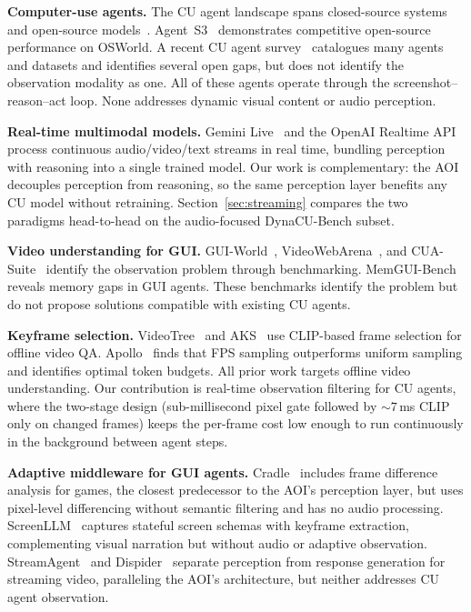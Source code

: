 \documentclass[11pt]{article}
\begin{document}
\textbf{Computer-use agents.}
The CU agent landscape spans closed-source systems~\citep{anthropic2024claude,openai2025cua,gemini25cu,surfer2} and open-source models~\citep{uitars2,opencua,fara7b,guiowl,coact}.
Agent~S3~\citep{agents3} demonstrates competitive open-source performance on OSWorld.
A recent CU agent survey~\citep{cusurvey} catalogues many agents and datasets and identifies several open gaps, but does not identify the observation modality as one.
All of these agents operate through the screenshot--reason--act loop.
None addresses dynamic visual content or audio perception.

\textbf{Real-time multimodal models.}
Gemini Live~\citep{geminilive} and the OpenAI Realtime API~\citep{openairealtime} process continuous audio/video/text streams in real time, bundling perception with reasoning into a single trained model.
Our work is complementary: the AOI decouples perception from reasoning, so the same perception layer benefits any CU model without retraining.
Section~\ref{sec:streaming} compares the two paradigms head-to-head on the audio-focused DynaCU-Bench subset.

\textbf{Video understanding for GUI.}
GUI-World~\citep{guiworld}, VideoWebArena~\citep{videowebarena}, and CUA-Suite~\citep{cuasuite} identify the observation problem through benchmarking.
MemGUI-Bench~\citep{memguibench} reveals memory gaps in GUI agents.
These benchmarks identify the problem but do not propose solutions compatible with existing CU agents.

\textbf{Keyframe selection.}
VideoTree~\citep{videotree} and AKS~\citep{aks} use CLIP-based frame selection for offline video QA.
Apollo~\citep{apollo} finds that FPS sampling outperforms uniform sampling and identifies optimal token budgets.
All prior work targets offline video understanding. Our contribution is real-time observation filtering for CU agents, where the two-stage design (sub-millisecond pixel gate followed by ${\sim}7$\,ms CLIP only on changed frames) keeps the per-frame cost low enough to run continuously in the background between agent steps.

\textbf{Adaptive middleware for GUI agents.}
Cradle~\citep{cradle} includes frame difference analysis for games, the closest predecessor to the AOI's perception layer, but uses pixel-level differencing without semantic filtering and has no audio processing.
ScreenLLM~\citep{screenllm} captures stateful screen schemas with keyframe extraction, complementing visual narration but without audio or adaptive observation.
StreamAgent~\citep{streamagent} and Dispider~\citep{dispider} separate perception from response generation for streaming video, paralleling the AOI's architecture, but neither addresses CU agent observation.
\end{document}
